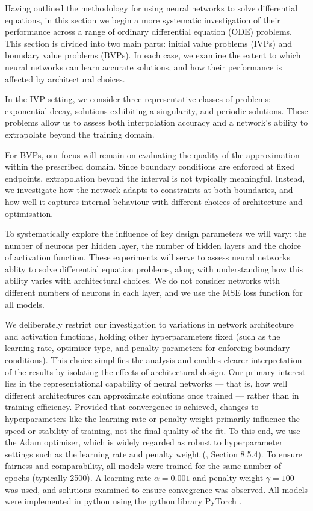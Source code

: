 Having outlined the methodology for using neural networks to solve differential equations, in this 
section we begin a more systematic investigation of their performance across a range of ordinary
differential equation (ODE) problems. This section is divided into two main parts: initial value 
problems (IVPs) and boundary value problems (BVPs). In each case, we examine the extent to which 
neural networks can learn accurate solutions, and how their performance is affected by architectural 
choices.

In the IVP setting, we consider three representative classes of problems: exponential decay,
solutions exhibiting a singularity, and periodic solutions. These problems allow us to assess 
both interpolation accuracy and a network's ability to extrapolate beyond the training domain.

For BVPs, our focus will remain on evaluating the quality of the approximation within the 
prescribed domain. Since boundary conditions are enforced at fixed endpoints, extrapolation 
beyond the interval is not typically meaningful. Instead, we investigate how the network adapts
to constraints at both boundaries, and how well it captures internal behaviour with different
choices of architecture and optimisation.

To systematically explore the influence of key design parameters we will vary: 
the number of neurons per hidden layer, the number of hidden layers and the choice of activation 
function. These experiments will serve to assess neural networks ablity to solve differential 
equation problems, along with understanding how this ability varies with architectural choices. 
We do not consider networks with different numbers of neurons in each layer, and we use the MSE
loss function for all models. 

We deliberately restrict our investigation to variations in network architecture and activation 
functions, holding other hyperparameters fixed (such as the learning rate, optimiser type, and 
penalty parameters for enforcing boundary conditions). This choice simplifies the analysis and 
enables clearer interpretation of the results by isolating the effects of architectural design. 
Our primary interest lies in the representational capability of neural networks — that is, how 
well different architectures can approximate solutions once trained — rather than in training 
efficiency. Provided that convergence is achieved, changes to hyperparameters like the learning 
rate or penalty weight primarily influence the speed or stability of training, not the final quality 
of the fit. To this end, we use the Adam optimiser, which is widely regarded as robust to 
hyperparameter settings such as the learning rate and penalty weight (\cite{goodfellow2016deep},
Section 8.5.4). To ensure fairness and comparability, all models were trained for the same 
number of epochs (typically 2500). A learning rate $\alpha = 0.001$ and penalty weight 
$\gamma = 100$ was used, and solutions examined to ensure convegrence was observed. All 
models were implemented in python using the python library PyTorch \cite{paszke2017automatic}.


